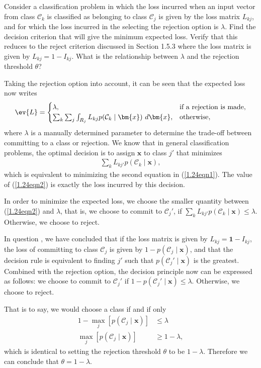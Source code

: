 \begin{question}{1.24}
	Consider a classification problem in which the loss incurred when an input vector from class $\mathcal{C}_k$ is classified as belonging to class $\mathcal{C}_j$ is given by the loss matrix $L_{kj}$, and for which the loss incurred in the selecting the rejection option is $\lambda$. Find the decision criterion that will give the minimum expected loss. Verify that this reduces to the reject criterion discussed in Section 1.5.3 where the loss matrix is given by $L_{kj} = 1 - I_{kj}$. What is the relationship between $\lambda$ and the rejection threshold $\theta$?
\end{question}

\begin{answer}{}
	Taking the rejection option into account, it can be seen that the expected loss now writes
	\begin{equation}\label{1.24eqn1}
		\ev{L} =
		\begin{cases}
			\lambda, &\mbox{if a rejection is made},\\
			\sum_{k}\sum_{j}\int_{R_j} L_{kj}p(\mathcal{C}_k \mid \bm{x})\ d\bm{x}, &\mbox{otherwise},
		\end{cases}
	\end{equation}
	where $\lambda$ is a manually determined parameter to determine the trade-off between committing to a class or rejection. We know that in general classification problems, the optimal decision is to assign $\bm{x}$ to class $j'$ that minimizes
	\begin{align}\label{1.24eqn2}
		\sum_{k} L_{kj'}p(\mathcal{C}_k \mid \bm{x}),
	\end{align}
	which is equivalent to minimizing the second equation in (\ref{1.24eqn1}). The value of (\ref{1.24eqn2}) is exactly the loss incurred by this decision.
	
	
	In order to minimize the expected loss, we choose the smaller quantity between (\ref{1.24eqn2}) and $\lambda$, that is, we choose to commit to $\mathcal{C}_j'$, if $\sum_{k} L_{kj'}p(\mathcal{C}_k \mid \bm{x}) \leq \lambda$. Otherwise, we choose to reject.
	
	In question , we have concluded that if the loss matrix is given by $L_{kj} = \bm{1} - I_{kj}$, the loss of committing to class $\mathcal{C}_j$ is given by $1 - p(\mathcal{C}_j \mid \bm{x})$, and that the decision rule is equivalent to finding $j'$ such that $p(\mathcal{C}_j' \mid \bm{x})$ is the greatest. Combined with the rejection option, the decision principle now can be expressed as follows: we choose to commit to $\mathcal{C}_j'$ if $1 - p(\mathcal{C}_j' \mid \bm{x}) \leq  \lambda$. Otherwise, we choose to reject. 
	
	That is to say, we would choose a class if and if only
	\begin{align}
		1 - \max_j \left[ p(\mathcal{C}_j \mid \bm{x}) \right] &\leq \lambda\\
		\max_j \left[ p(\mathcal{C}_j \mid \bm{x}) \right] &\geq 1 - \lambda,
	\end{align}
	which is identical to setting the rejection threshold $\theta$ to be $1 - \lambda$. Therefore we can conclude that $\theta = 1 - \lambda$.
\end{answer}